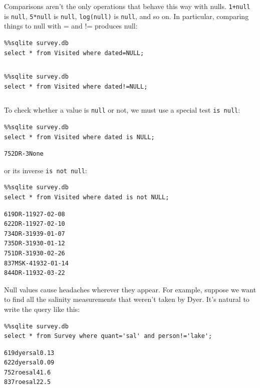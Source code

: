 \documentclass[]{book}
\begin{document}
Comparisons aren't the only operations that behave this way with nulls.
\texttt{1+null} is \texttt{null}, \texttt{5*null} is \texttt{null},
\texttt{log(null)} is \texttt{null}, and so on. In particular, comparing
things to null with = and != produces null:

\begin{verbatim}
%%sqlite survey.db
select * from Visited where dated=NULL;
\end{verbatim}

\begin{verbatim}
\end{verbatim}

\begin{verbatim}
%%sqlite survey.db
select * from Visited where dated!=NULL;
\end{verbatim}

\begin{verbatim}
\end{verbatim}

To check whether a value is \texttt{null} or not, we must use a special
test \texttt{is null}:

\begin{verbatim}
%%sqlite survey.db
select * from Visited where dated is NULL;
\end{verbatim}

\begin{verbatim}
752DR-3None
\end{verbatim}

or its inverse \texttt{is not null}:

\begin{verbatim}
%%sqlite survey.db
select * from Visited where dated is not NULL;
\end{verbatim}

\begin{verbatim}
619DR-11927-02-08
622DR-11927-02-10
734DR-31939-01-07
735DR-31930-01-12
751DR-31930-02-26
837MSK-41932-01-14
844DR-11932-03-22
\end{verbatim}

Null values cause headaches wherever they appear. For example, suppose
we want to find all the salinity measurements that weren't taken by
Dyer. It's natural to write the query like this:

\begin{verbatim}
%%sqlite survey.db
select * from Survey where quant='sal' and person!='lake';
\end{verbatim}

\begin{verbatim}
619dyersal0.13
622dyersal0.09
752roesal41.6
837roesal22.5
\end{verbatim}
\end{document}
